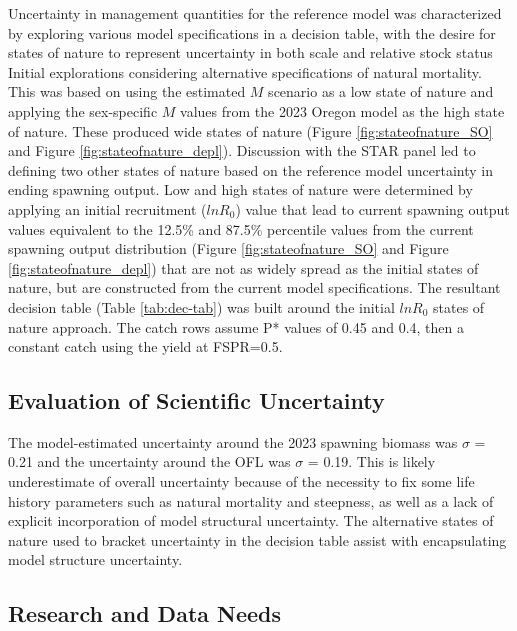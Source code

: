 \documentclass[11pt,
  letterpaper,
]{article}
\begin{document}
Uncertainty in management quantities for the reference model was characterized by exploring various model specifications in a decision table, with the desire for states of nature to represent uncertainty in both scale and relative stock status Initial explorations considering alternative specifications of natural mortality. This was based on using the estimated \(M\) scenario as a low state of nature and applying the sex-specific \(M\) values from the 2023 Oregon model as the high state of nature. These produced wide states of nature (Figure \ref{fig:stateofnature_SO} and Figure \ref{fig:stateofnature_depl}). Discussion with the STAR panel led to defining two other states of nature based on the reference model uncertainty in ending spawning output. Low and high states of nature were determined by applying an initial recruitment (\(lnR_0\)) value that lead to current spawning output values equivalent to the 12.5\% and 87.5\% percentile values from the current spawning output distribution (Figure \ref{fig:stateofnature_SO} and Figure \ref{fig:stateofnature_depl}) that are not as widely spread as the initial states of nature, but are constructed from the current model specifications. The resultant decision table (Table \ref{tab:dec-tab}) was built around the initial \(lnR_0\) states of nature approach. The catch rows assume P* values of 0.45 and 0.4, then a constant catch using the yield at FSPR=0.5.

\hypertarget{evaluation-of-scientific-uncertainty}{%
\subsection{Evaluation of Scientific Uncertainty}\label{evaluation-of-scientific-uncertainty}}

The model-estimated uncertainty around the 2023 spawning biomass was \(\sigma\) = 0.21 and the uncertainty around the OFL was \(\sigma\) = 0.19. This is likely underestimate of overall uncertainty because of the necessity to fix some life history parameters such as natural mortality and steepness, as well as a lack of explicit incorporation of model structural uncertainty. The alternative states of nature used to bracket uncertainty in the decision table assist with encapsulating model structure uncertainty.

\hypertarget{research-and-data-needs-1}{%
\subsection{Research and Data Needs}\label{research-and-data-needs-1}}
\end{document}
